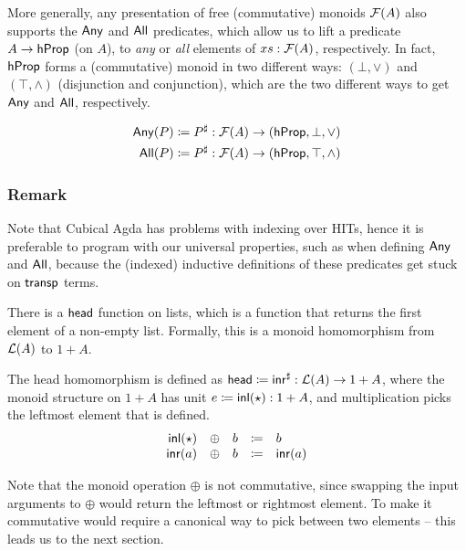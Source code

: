More generally, any presentation of free (commutative) monoids $\mathcal{F}(A)$ also supports the
$\operatorname{\mathsf{Any}}$ and $\operatorname{\mathsf{All}}$ predicates, which allow us to lift a predicate $A \to \mathsf{hProp}$ (on $A$),
to \emph{any} or \emph{all} elements of $xs : \mathcal{F}(A)$, respectively.
%
In fact, $\mathsf{hProp}$ forms a (commutative) monoid in two different ways: $(\bot,\vee)$ and $(\top,\wedge)$
(disjunction and conjunction), which are the two different ways to get $\operatorname{\mathsf{Any}}$ and $\operatorname{\mathsf{All}}$, respectively.
\begin{definition}
      \label{def:any-all}
      \begin{align*}
            \mathsf{Any}(P) & \mathrel{\coloneq} {P}^{\sharp} : \mathcal{F}(A) \to (\mathsf{hProp}, \bot, \vee)   \\
            \mathsf{All}(P) & \mathrel{\coloneq} {P}^{\sharp} : \mathcal{F}(A) \to (\mathsf{hProp}, \top, \wedge)
      \end{align*}
\end{definition}

\subsubsection*{Remark}
Note that Cubical Agda has problems with indexing over HITs,
hence it is preferable to program with our universal properties, such as when defining $\operatorname{\mathsf{Any}}$ and $\operatorname{\mathsf{All}}$,
because the (indexed) inductive definitions of these predicates get stuck on $\operatorname{\mathsf{transp}}$ terms.

There is a $\operatorname{\mathsf{head}}$ function on lists, which is a function that returns the first element of a non-empty list.
%
Formally, this is a monoid homomorphism from $\mathcal{L}(A)$ to $1 + A$.

\begin{definition}
      \label{def:head-free-monoid}
      The head homomorphism is defined as
      \(
      \operatorname{\mathsf{head}} \mathrel{\coloneq} {\operatorname{\mathsf{inr}}}^{\sharp} : \mathcal{L}(A) \to 1 + A
      \),
      where the monoid structure on $1 + A$ has unit
      \(
      e \mathrel{\coloneq} \operatorname{\mathsf{inl}}(\star) : 1 + A
      \),
      and multiplication picks the leftmost element that is defined.
      \[
            \begin{array}{rclcl}
                  \operatorname{\mathsf{inl}}(\star) & \oplus & b & \mathrel{\coloneq} & b       \\
                  \operatorname{\mathsf{inr}}(a)    & \oplus & b & \mathrel{\coloneq} & \operatorname{\mathsf{inr}}(a) \\
            \end{array}
      \]
\end{definition}

Note that the monoid operation $\oplus$ is not commutative, since
swapping the input arguments to $\oplus$ would return the leftmost or rightmost element.
%
To make it commutative would require a canonical way to pick between two elements --
this leads us to the next section.
